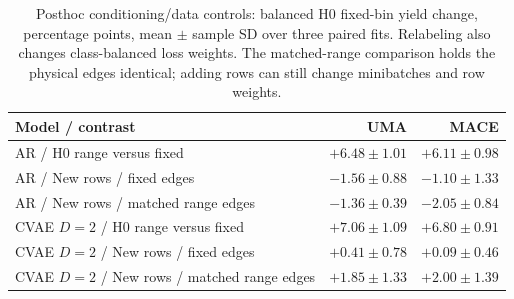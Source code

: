 \begin{table}[htbp]
\centering\small
\caption{Posthoc conditioning/data controls: balanced H0 fixed-bin yield change, percentage points, mean $\pm$ sample SD over three paired fits. Relabeling also changes class-balanced loss weights. The matched-range comparison holds the physical edges identical; adding rows can still change minibatches and row weights.}
\begin{tabular}{lrr}\toprule
Model / contrast & UMA & MACE\\\midrule
AR / H0 range versus fixed & $+6.48\pm1.01$ & $+6.11\pm0.98$\\
AR / New rows / fixed edges & $-1.56\pm0.88$ & $-1.10\pm1.33$\\
AR / New rows / matched range edges & $-1.36\pm0.39$ & $-2.05\pm0.84$\\
CVAE $D=2$ / H0 range versus fixed & $+7.06\pm1.09$ & $+6.80\pm0.91$\\
CVAE $D=2$ / New rows / fixed edges & $+0.41\pm0.78$ & $+0.09\pm0.46$\\
CVAE $D=2$ / New rows / matched range edges & $+1.85\pm1.33$ & $+2.00\pm1.39$\\
\bottomrule\end{tabular}
\end{table}
